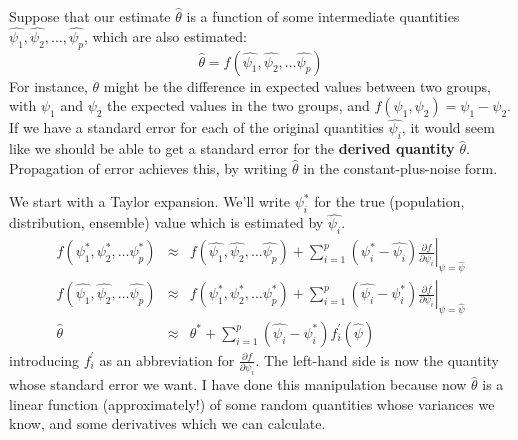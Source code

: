 \documentclass{article}
\begin{document}
Suppose that our estimate $\widehat{\theta}$ is a function of some intermediate
quantities $\widehat{\psi_1}, \widehat{\psi_2}, \ldots, \widehat{\psi_p}$,
which are also estimated:
\begin{equation}
\widehat{\theta} = f(\widehat{\psi_1},\widehat{\psi_2}, \ldots  \widehat{\psi_p} )
\end{equation}
For instance, $\theta$ might be the difference in expected values between two
groups, with $\psi_1$ and $\psi_2$ the expected values in the two groups, and
$f(\psi_1,\psi_2) = \psi_1 - \psi_2$.  If we have a standard error for each of
the original quantities $\widehat{\psi_i}$, it would seem like we should be
able to get a standard error for the {\bf derived quantity} $\widehat{\theta}$.
Propagation of error achieves this, by writing $\widehat{\theta}$ in
the constant-plus-noise form.

We start with a Taylor expansion.  We'll write $\psi_i^*$ for the true
(population, distribution, ensemble) value which is estimated by
$\widehat{\psi_i}$.
\begin{eqnarray}
f(\psi_1^*,\psi_2^*,\ldots \psi_p^*) & \approx & f(\widehat{\psi_1},\widehat{\psi_2},\ldots\widehat{\psi_p}) + \sum_{i=1}^{p}{(\psi_i^* - \widehat{\psi_i}) {\left.\frac{\partial f}{\partial \psi_i}\right|}_{\psi = \widehat{\psi}}}\\
f(\widehat{\psi_1},\widehat{\psi_2},\ldots\widehat{\psi_p}) & \approx & f(\psi_1^*,\psi_2^*,\ldots \psi_p^*) + \sum_{i=1}^{p}{(\widehat{\psi_i}-\psi_i^*) {\left.\frac{\partial f}{\partial \psi_i}\right|}_{\psi = \widehat{\psi}}}\\
\hat{\theta} & \approx & \theta^* + \sum_{i=1}^{p}{(\widehat{\psi_i} - \psi_i^*) f^{\prime}_i(\widehat{\psi})}
\label{eqn:estimate-in-taylor-expansion}
\end{eqnarray}
introducing $f^{\prime}_i$ as an abbreviation for $\frac{\partial f}{\partial
  \psi_i}$.  The left-hand side is now the quantity whose standard error we
want.  I have done this manipulation because now $\hat{\theta}$ is a linear
function (approximately!) of some random quantities whose variances we know,
and some derivatives which we can calculate.
\end{document}

